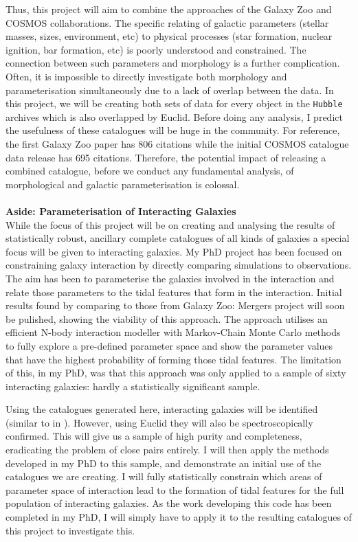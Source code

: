 \documentclass[11pt,usenatbib]{article}
\begin{document}
Thus, this project will aim to combine the approaches of the Galaxy Zoo and COSMOS collaborations. The specific relating of galactic parameters (stellar masses, sizes, environment, etc) to physical processes (star formation, nuclear ignition, bar formation, etc) is poorly understood and constrained. The connection between such parameters and morphology is a further complication. Often, it is impossible to directly investigate both morphology and parameterisation simultaneously due to a lack of overlap between the data. In this project, we will be creating both sets of data for every object in the \texttt{Hubble} archives which is also overlapped by Euclid. Before doing any analysis, I predict the usefulness of these catalogues will be huge in the community. For reference, the first Galaxy Zoo paper \citep{lintott_08} has 806 citations while the initial COSMOS catalogue data release has 695 citations. Therefore, the potential impact of releasing a combined catalogue, before we conduct any fundamental analysis, of morphological and galactic parameterisation is colossal.
\\
\\
\noindent \textbf{Aside: Parameterisation of Interacting Galaxies} \\
\noindent While the focus of this project will be on creating and analysing the results of statistically robust, ancillary complete catalogues of all kinds of galaxies a special focus will be given to interacting galaxies. My PhD project has been focused on constraining galaxy interaction by directly comparing simulations to observations. The aim has been to parameterise the galaxies involved in the interaction and relate those parameters to the tidal features that form in the interaction. Initial results found by comparing to those from Galaxy Zoo: Mergers project will soon be pulished, showing the viability of this approach. The approach utilises an efficient N-body interaction modeller with Markov-Chain Monte Carlo methods to fully explore a pre-defined parameter space and show the parameter values that have the highest probability of forming those tidal features. The limitation of this, in my PhD, was that this approach was only applied to a sample of sixty interacting galaxies: hardly a statistically significant sample. 

Using the catalogues generated here, interacting galaxies will be identified (similar to in \citet{O'Ryan}). However, using Euclid they will also be spectroscopically confirmed. This will give us a sample of high purity and completeness, eradicating the problem of close pairs entirely. I will then apply the methods developed in my PhD to this sample, and demonstrate an initial use of the catalogues we are creating. I will fully statistically constrain which areas of parameter space of interaction lead to the formation of tidal features for the full population of interacting galaxies. As the work developing this code has been completed in my PhD, I will simply have to apply it to the resulting catalogues of this project to investigate this. 
\end{document}
